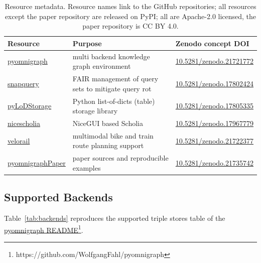 \documentclass[
]{ceurart}
\newcommand{\footnotelink}[2]{\href{#1}{#2}\footnote{#1}}
\begin{document}
\begin{table}
\caption{Resource metadata. Resource names link to the GitHub repositories;
all resources except the paper repository are released on PyPI; all are
Apache-2.0 licensed, the paper repository is CC BY 4.0.}
\label{tab:availability}
\begin{tabular}{lp{6cm}l}
\hline
Resource & Purpose & Zenodo concept DOI \\
\hline
\href{https://github.com/WolfgangFahl/pyomnigraph}{pyomnigraph}           & multi backend knowledge graph environment            & \href{https://doi.org/10.5281/zenodo.21721772}{10.5281/zenodo.21721772} \\
\href{https://github.com/WolfgangFahl/snapquery}{snapquery}               & FAIR management of query sets to mitigate query rot  & \href{https://doi.org/10.5281/zenodo.17802424}{10.5281/zenodo.17802424} \\
\href{https://github.com/WolfgangFahl/pyLoDStorage}{pyLoDStorage}         & Python list-of-dicts (table) storage library         & \href{https://doi.org/10.5281/zenodo.17805335}{10.5281/zenodo.17805335} \\
\href{https://github.com/WolfgangFahl/nicescholia}{nicescholia}           & NiceGUI based Scholia                                & \href{https://doi.org/10.5281/zenodo.17967779}{10.5281/zenodo.17967779} \\
\href{https://github.com/WolfgangFahl/velorail}{velorail}                 & multimodal bike and train route planning support     & \href{https://doi.org/10.5281/zenodo.21722377}{10.5281/zenodo.21722377} \\
\href{https://github.com/WolfgangFahl/pyomnigraphPaper}{pyomnigraphPaper} & paper sources and reproducible examples              & \href{https://doi.org/10.5281/zenodo.21735742}{10.5281/zenodo.21735742} \\
\hline
\end{tabular}
\end{table}

\subsection{Supported Backends}\label{sec:backends}
Table~\ref{tab:backends} reproduces the supported triple stores table of the
\footnotelink{https://github.com/WolfgangFahl/pyomnigraph}{pyomnigraph README}.
\end{document}
